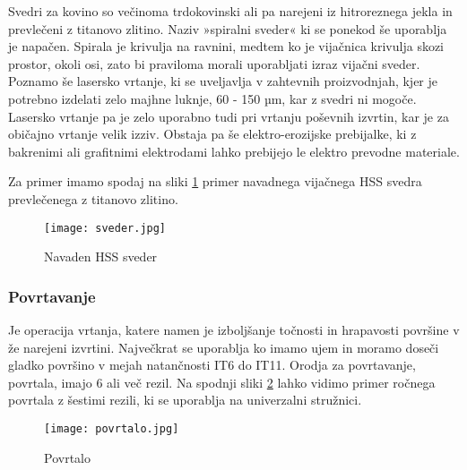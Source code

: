 Svedri za kovino so večinoma trdokovinski ali pa narejeni iz
hitroreznega jekla in prevlečeni z titanovo zlitino.
Naziv »spiralni sveder« ki se ponekod še uporablja je napačen.
Spirala je krivulja na ravnini, medtem ko je vijačnica krivulja
skozi prostor, okoli osi, zato bi praviloma morali uporabljati
izraz vijačni sveder.
Poznamo še lasersko vrtanje, ki se uveljavlja v zahtevnih
proizvodnjah, kjer je potrebno izdelati zelo majhne luknje,
60 - 150 µm, kar z svedri ni mogoče. Lasersko vrtanje pa je zelo
uporabno tudi pri vrtanju poševnih izvrtin, kar je za običajno
vrtanje velik izziv.
Obstaja pa še elektro-erozijske prebijalke, ki z bakrenimi ali
grafitnimi elektrodami lahko prebijejo le elektro prevodne materiale.

Za primer imamo spodaj na sliki \ref{hss_sveder} primer navadnega
vijačnega HSS svedra prevlečenega z titanovo zlitino.
\begin{figure}[H]
	\begin{center}
		\texttt{[image: sveder.jpg]}
		\caption{Navaden HSS sveder
			\cite{sveder}}
		\label{hss_sveder}
	\end{center}
\end{figure}
\subsubsection{Povrtavanje}
Je operacija vrtanja, katere namen je izboljšanje točnosti in
hrapavosti površine v že narejeni izvrtini. Največkrat se
uporablja ko imamo ujem in moramo doseči gladko površino v
mejah natančnosti IT6 do IT11. Orodja za povrtavanje, povrtala,
imajo 6 ali več rezil. Na spodnji sliki \ref{povrtalo} lahko vidimo
primer ročnega povrtala z šestimi rezili, ki se uporablja na
univerzalni stružnici.
\begin{figure}[H]
	\begin{center}
		\texttt{[image: povrtalo.jpg]}
		\caption{Povrtalo
			\cite{sts_arhiv}}
		\label{povrtalo}
	\end{center}
\end{figure}

